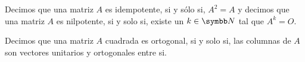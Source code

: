 \documentclass{article}
\begin{document}
\maketitle

\begin{enumerate}
    \begin{definition}
        Decimos que una matriz \(A\) es idempotente, si y sólo si, \(A^2 = A\) y decimos que una matriz \(A\) es nilpotente,
        si y solo si, existe un \(k \in \realN\) tal que \(A^k = O\).
    \end{definition}
    \begin{definition}
        Decimos que una matriz \(A\) cuadrada es ortogonal, si y solo si, 
        las columnas de \(A\) son vectores unitarios y ortogonales entre si.
    \end{definition}
    \setcounter{enumi}{23}
    
    \setcounter{enumi}{27}
    
    \setcounter{enumi}{30}
    
    \setcounter{enumi}{40}
    
    \setcounter{enumi}{53}
    
    \setcounter{enumi}{71}
    
\end{enumerate}
\end{document}
